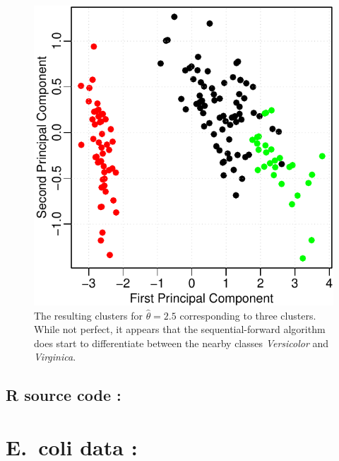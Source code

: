 \begin{multicols*}{2}

\begin{figure}[H]
  \centering
    \includegraphics[width=0.60\linewidth]{images/iris_3_clusters.pdf}
  \caption{The resulting clusters for $\hat{\theta}=2.5$ corresponding to three clusters.  While not perfect, it appears that the sequential-forward algorithm does start to differentiate between the nearby classes \emph{Versicolor} and \emph{Virginica}.}
\end{figure}

\subsection{R source code :}


\end{multicols*}

\newpage

\section{E.~coli data :}

